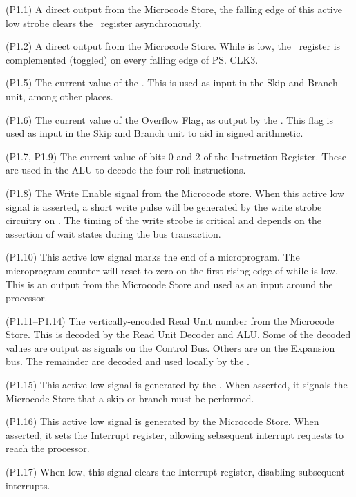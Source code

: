 \begin{description}

\li{\CLL} (P1.1) A direct output from the Microcode Store, the falling edge of
this active low strobe clears the \Lreg~register asynchronously.

\li{\CPL} (P1.2) A direct output from the Microcode Store. While \CPL is low,
the \Lreg~register is complemented (toggled) on every falling edge of
\ps{CLK3}.

\li{\FL} (P1.5) The current value of the \Lreg{}. This is used as input in the
Skip and Branch unit, among other places.

\li{\FV} (P1.6) The current value of the Overflow Flag, as output by the
\ALU. This flag is used as input in the Skip and Branch unit to aid in signed
arithmetic.

 (P1.7, P1.9) The current value of bits 0 and 2 of the
Instruction Register. These are used in the ALU to decode the four roll
instructions.

\li{\WEN} (P1.8) The Write Enable signal from the Microcode store. When this
active low signal is asserted, a short write pulse will be generated by the
write strobe circuitry on . The timing of the write strobe is
critical and depends on the assertion of wait states during the bus
transaction.

\li{\END} (P1.10) This active low signal marks the end of a
microprogram. The microprogram counter will reset to zero on the first
rising edge of  while \END is low. This is an output from the
Microcode Store and used as an input around the processor.

 (P1.11–P1.14) The vertically-encoded Read
Unit number from the Microcode Store. This is decoded by the Read Unit
Decoder and ALU. Some of the decoded values are output as signals on
the Control Bus. Others are on the Expansion bus. The remainder are
decoded and used locally by the \ALU.

\li{\SKIP} (P1.15) This active low signal is generated by the
\SBU{}. When asserted, it signals the Microcode Store that a skip or
branch must be performed.

\li{\STI} (P1.16) This active low signal is generated by the Microcode
Store. When asserted, it sets the Interrupt register, allowing sebsequent
interrupt requests to reach the processor.

\li{\CLI} (P1.17) When low, this signal clears the Interrupt
register, disabling subsequent interrupts.


\end{description}
